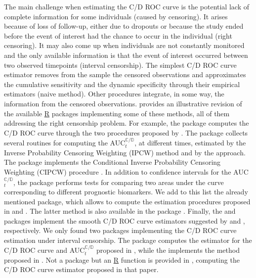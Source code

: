 The main challenge when estimating the C/D ROC curve is the potential lack of complete information for some individuals (caused by censoring). It arises because of loss of follow-up, either due to dropouts or because the study ended before the event of interest had the chance to occur in the individual (right censoring). It may also come up when individuals are not constantly monitored and the only available information is that the event of interest occurred between two observed timepoints (interval censorship). The simplest C/D ROC curve estimator removes from the sample the censored observations and approximates the cumulative sensitivity and the dynamic specificity through their empirical estimators (naive method). Other procedures integrate, in some way, the information from the censored observations.  \citet{Kamarudin2017} provides an illustrative revision of the available \url{ R} packages implementing some of these methods, all of them addressing the right censorship problem. For example, the  package \citep{survivalROC} computes the C/D ROC curve through the two procedures proposed by \citet{Heagerty2000}. The  package \citep{survAUC} collects several routines for computing the AUC$_{t}^{\mathbb{C}/\mathbb{D}}$, at different times, estimated by the Inverse Probability Censoring Weighting (IPCW) method \citep{Uno2007, Hung2010} and by the \citet{Chambles2006} approach. The   package \citep{timeROC} implements the Conditional Inverse Probability Censoring Weighting (CIPCW) procedure \citep{Blanche2013}. In addition to confidence intervals for the AUC$_{t}^{\mathbb{C}/\mathbb{D}}$, the package performs tests for comparing two areas under the curve corresponding to different prognostic biomarkers. We add to this list the already mentioned  package, which allows to compute the estimation procedures proposed in \citet{Martinez-Camblor2016} and \citet{li18}. The latter method is also available in the  package \citep{tdROC}. Finally,  the  \citep{Diaz-Coto2020a} and   \citep{cenROC} packages implement the smooth C/D ROC curve estimators suggested by \citet{Martinez-Camblor2018} and \citet{Kassu2020}, respectively. We only found two packages implementing the C/D ROC curve estimation under interval censorship. The  package \citep{intcensROC} computes the estimator for the C/D ROC curve and AUC$_{t}^{\mathbb{C}/\mathbb{D}}$ proposed in \citet{Wu2020}, while the  implements the method proposed in \citet{Kassu2022}. Not a package but an \url{R} function is provided in  \citet{Diaz-Coto2020}, computing the C/D ROC curve estimator proposed in that paper.

